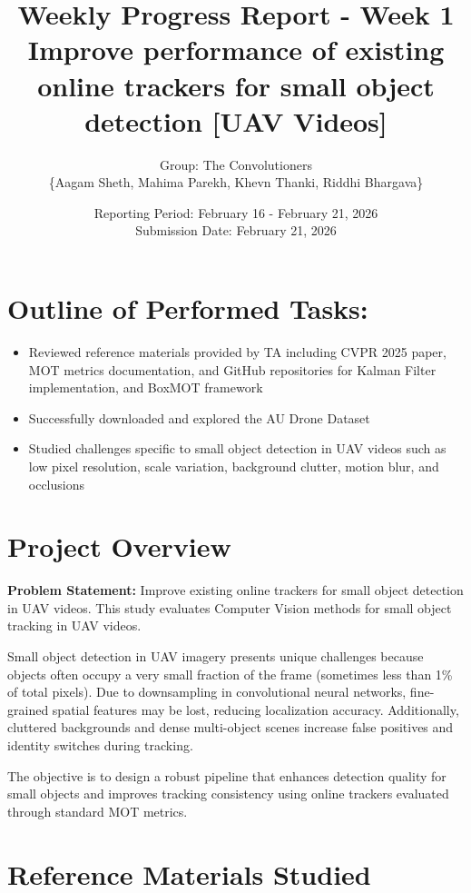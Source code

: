 \documentclass[11pt,a4paper]{article}
\title{\textbf{Weekly Progress Report - Week 1} \\
	\large Improve performance of existing online trackers for small object detection [UAV Videos]}
\author{Group: The Convolutioners\\\{Aagam Sheth, Mahima Parekh, Khevn Thanki, Riddhi Bhargava\}}
\date{Reporting Period: February 16 - February 21, 2026 \\
	Submission Date: February 21, 2026}
\begin{document}
	
	\maketitle
	
	\section*{Outline of Performed Tasks:}
	
	\begin{itemize}[leftmargin=*]
		\item Reviewed reference materials provided by TA including CVPR 2025 paper, MOT metrics documentation, and GitHub repositories for Kalman Filter implementation, and BoxMOT framework
		\item Successfully downloaded and explored the AU Drone Dataset
		\item Studied challenges specific to small object detection in UAV videos such as low pixel resolution, scale variation, background clutter, motion blur, and occlusions
	\end{itemize}
	
	\section*{Project Overview}
	
	\textbf{Problem Statement:} Improve existing online trackers for small object detection in UAV videos. This study evaluates Computer Vision methods for small object tracking in UAV videos.
	
	Small object detection in UAV imagery presents unique challenges because objects often occupy a very small fraction of the frame (sometimes less than 1\% of total pixels). Due to downsampling in convolutional neural networks, fine-grained spatial features may be lost, reducing localization accuracy. Additionally, cluttered backgrounds and dense multi-object scenes increase false positives and identity switches during tracking. 
	
	The objective is to design a robust pipeline that enhances detection quality for small objects and improves tracking consistency using online trackers evaluated through standard MOT metrics.
	
	\section*{Reference Materials Studied}
	
\end{document}
